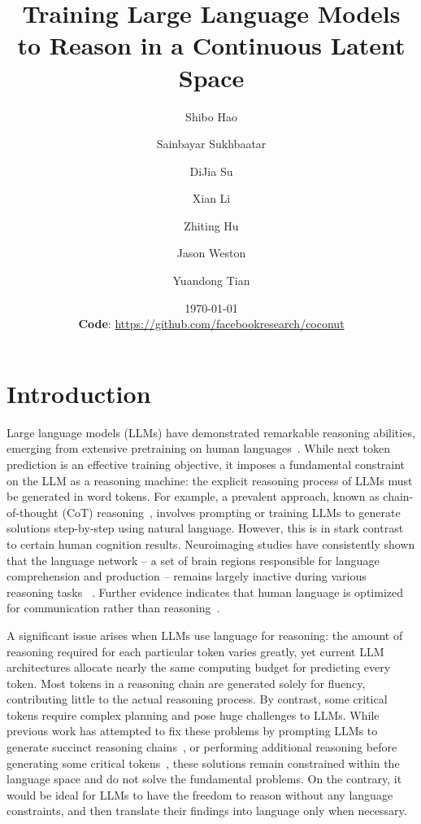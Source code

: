 \documentclass[]{fairmeta}
\title{Training Large Language Models to Reason in a Continuous Latent Space}
\author[1,2,*]{Shibo Hao}
\author[1]{Sainbayar Sukhbaatar}
\author[1]{DiJia Su}
\author[1]{Xian Li}
\author[2]{Zhiting Hu}
\author[1]{Jason Weston}
\author[1]{Yuandong Tian}
\affiliation[1]{FAIR at Meta}
\affiliation[2]{UC San Diego}
\date{\today\\
\textbf{Code}: \url{https://github.com/facebookresearch/coconut}}
\begin{document}
\maketitle

\section{Introduction}
\label{section:intro}
Large language models (LLMs) have demonstrated remarkable reasoning abilities, emerging from extensive pretraining on human languages~\citep{dubey2024llama, achiam2023gpt}. While next token prediction is an effective training objective, it imposes a fundamental constraint on the LLM as a reasoning machine: the explicit reasoning process of LLMs must be generated in word tokens. For example, a prevalent approach, known as chain-of-thought (CoT) reasoning~\citep{wei2022chain}, involves prompting or training LLMs to generate solutions step-by-step using natural language. However, this is in stark contrast to certain human cognition results. Neuroimaging studies have consistently shown that the language network -- a set of brain regions responsible for language comprehension and production -- remains largely inactive during various reasoning tasks ~\citep{amalric2019distinct, monti2012thought, monti2007functional, monti2009boundaries, fedorenko2011functional}. Further evidence indicates that human language is optimized for communication rather than reasoning~\citep{fedorenko2024language}.

A significant issue arises when LLMs use language for reasoning: the amount of reasoning required for each particular token varies greatly, yet current LLM architectures allocate nearly the same computing budget for predicting every token. Most tokens in a reasoning chain are generated solely for fluency, contributing little to the actual reasoning process. By contrast, some critical tokens require complex planning and pose huge challenges to LLMs. While previous work has attempted to fix these problems by prompting LLMs to generate succinct reasoning chains~\citep{madaan2022text}, or performing additional reasoning before generating some critical tokens~\citep{zelikman2024quiet}, these solutions remain constrained within the language space and do not solve the fundamental problems. On the contrary, it would be ideal for LLMs to have the freedom to reason without any language constraints, and then translate their findings into language only when necessary.


\end{document}
